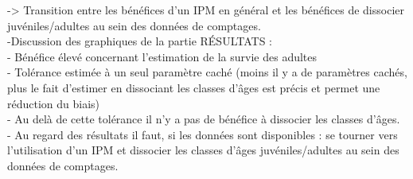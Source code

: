 \documentclass[12pt,a4paper]{article}
\begin{document}
-> Transition entre les bénéfices d'un IPM en général et les bénéfices de dissocier juvéniles/adultes au sein des données de comptages.\\

-Discussion des graphiques de la partie RÉSULTATS : \\
 - Bénéfice élevé concernant  l'estimation de la survie des adultes\\
 - Tolérance estimée à un seul paramètre caché (moins il y a de paramètres cachés, plus le fait d'estimer en dissociant les classes d'âges est précis et permet une réduction du biais)\\
 - Au delà de cette tolérance il n'y a pas de bénéfice à dissocier les classes d'âges.\\

- Au regard des résultats il faut, si les données sont disponibles : se tourner vers l'utilisation d'un IPM et dissocier les classes d'âges juvéniles/adultes au sein des données de comptages.
\end{document}
